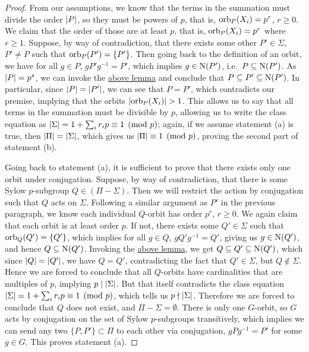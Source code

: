 \begin{proof}
    From our assumptions, we know that the terms in the summation
    must divide the order \(\abs{P}\), so they must be powers of \(p\),
    that is, \(\operatorname{orb}_P(X_i) = p^r\), \(r \geq 0\).
    We claim that the order of those are at least \(p\),
    that is, \(\operatorname{orb}_P(X_i) = p^r\) where \(r \geq 1\).
    Suppose, by way of contradiction,
    that there exists some other \(P' \in \Sigma\), \(P' \neq P\)
    such that \(\operatorname{orb}_P(P') = \{P'\}\).
    Then going back to the definition of an orbit,
    we have for all \(g \in P\), \(gP'g^{-1} = P'\),
    which implies \(g \in \operatorname{N}(P')\),
    i.e.\ \(P \subseteq \operatorname{N}(P')\).
    As \(\abs{P} = p^s\),
    we can invoke the \hyperref[lem:prime-power-sylow-subgroup]{above lemma}
    and conclude that \(P \subseteq P' \subseteq \operatorname{N}(P')\).
    In particular, since \(\abs{P} = \abs{P'}\),
    we can see that \(P = P'\),
    which contradicts our premise,
    implying that the orbits \(\abs{\operatorname{orb}_P(X_i)} > 1\).
    This allows us to say that all terms in the summation
    must be divisible by \(p\),
    allowing us to write the class equation as
    \(\abs{\Sigma} = 1 + \sum_i r_i p \equiv 1 \pmod{p}\);
    again, if we assume statement (a) is true,
    then \(\abs{\Pi} = \abs{\Sigma}\),
    which gives us \(\abs{\Pi} \equiv 1 \pmod{p}\),
    proving the second part of statement (b).

    Going back to statement (a),
    it is sufficient to prove that
    there exists only one orbit under conjugation.
    Suppose, by way of contradiction,
    that there is some Sylow \(p\)-subgroup \(Q \in (\Pi-\Sigma)\).
    Then we will restrict the action by conjugation
    such that \(Q\) acts on \(\Sigma\).
    Following a similar argument as \(P'\) in the previous paragraph,
    we know each individual \(Q\)-orbit has order \(p^r\), \(r \geq 0\).
    We again claim that each orbit is at least order \(p\).
    If not, there exists some \(Q' \in \Sigma\)
    such that \(\operatorname{orb}_{Q}(Q') = \{Q'\}\),
    which implies for all \(g \in Q\), \(gQ'g^{-1} = Q'\),
    giving us \(g \in \operatorname{N}(Q')\),
    and hence \(Q \subseteq \operatorname{N}(Q')\).
    Invoking the \hyperref[lem:prime-power-sylow-subgroup]{above lemma},
    we get \(Q \subseteq Q' \subseteq \operatorname{N}(Q')\),
    which since \(\abs{Q} = \abs{Q'}\), we have \(Q = Q'\),
    contradicting the fact that \(Q' \in \Sigma\),
    but \(Q \notin \Sigma\).
    Hence we are forced to conclude that all \(Q\)-orbits
    have cardinalities that are multiples of \(p\),
    implying \(p \mid \abs{\Sigma}\).
    But that itself contradicts the class equation
    \(\abs{\Sigma} = 1 + \sum_i r_i p \equiv 1 \pmod{p}\),
    which tells us \(p \nmid \abs{\Sigma}\).
    Therefore we are forced to conclude that \(Q\) does not exist,
    and \(\Pi-\Sigma = \emptyset\).
    There is only one \(G\)-orbit,
    so \(G\) acts by conjugation
    on the set of Sylow \(p\)-subgroups transitively,
    which implies we can send any two \(\{P,P'\} \subset \Pi\)
    to each other via conjugation, \(gPg^{-1} = P'\) for some \(g \in G\).
    This proves statement (a).


\end{proof}
